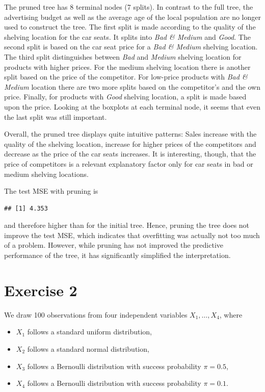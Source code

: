 \documentclass[
]{article}
\begin{document}
The pruned tree has 8 terminal nodes (7 splits). In contrast to the full
tree, the advertising budget as well as the average age of the local
population are no longer used to construct the tree. The first split is
made according to the quality of the shelving location for the car
seats. It splits into \textit{Bad \& Medium} and \textit{Good}. The
second split is based on the car seat price for a \textit{Bad \& Medium}
shelving location. The third split distinguishes between \textit{Bad}
and \textit{Medium} shelving location for products with higher prices.
For the medium shelving location there is another split based on the
price of the competitor. For low-price products with
\textit{Bad \& Medium} location there are two more splits based on the
competitor's and the own price. Finally, for products with \textit{Good}
shelving location, a split is made based upon the price. Looking at the
boxplots at each terminal node, it seems that even the last split was
still important.

Overall, the pruned tree displays quite intuitive patterns: Sales
increase with the quality of the shelving location, increase for higher
prices of the competitors and decrease as the price of the car seats
increases. It is interesting, though, that the price of competitors is a
relevant explanatory factor only for car seats in bad or medium shelving
locations.

The test MSE with pruning is

\begin{verbatim}
## [1] 4.353
\end{verbatim}

and therefore higher than for the initial tree. Hence, pruning the tree
does not improve the test MSE, which indicates that overfitting was
actually not too much of a problem. However, while pruning has not
improved the predictive performance of the tree, it has significantly
simplified the interpretation.

\newpage

\section{Exercise 2}\label{exercise-2}

We draw 100 observations from four independent variables
\(X_1,\ldots,X_4\), where

\begin{itemize}
  \item $X_1$ follows a standard uniform distribution,
  \item $X_2$ follows a standard normal distribution,
  \item $X_3$ follows a Bernoulli distribution with success probability $\pi = 0.5$,
  \item $X_4$ follows a Bernoulli distribution with success probability $\pi = 0.1$.
\end{itemize}
\end{document}
